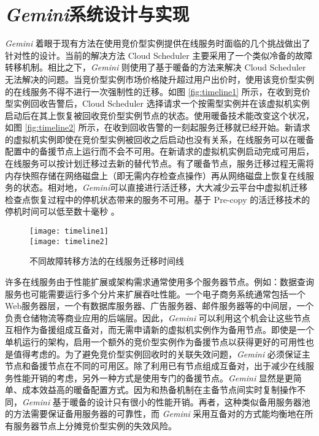 \section{\emph{Gemini}系统设计与实现}
\label{sec-gemini}
\emph{Gemini} 着眼于现有方法在使用竞价型实例提供在线服务时面临的几个挑战做出了针对性的设计。当前的解决方法 Cloud Scheduler \cite{He:2015:CCH:2749246.2749275} 主要采用了一个类似冷备的故障转移机制。相比之下，\emph{Gemini} 则使用了基于暖备的方法来解决 Cloud Scheduler 无法解决的问题。当竞价型实例市场价格陡升超过用户出价时，使用该竞价型实例的在线服务不得不进行一次强制性的迁移。如图 \ref{fig:timeline1} 所示，在收到竞价型实例回收告警后，Cloud Scheduler 选择请求一个按需型实例并在该虚拟机实例启动后在其上恢复被回收竞价型实例节点的状态。使用暖备技术能改变这个状况，如图 \ref{fig:timeline2} 所示，在收到回收告警的一刻起服务迁移就已经开始。新请求的虚拟机实例即使在竞价型实例被回收之后启动也没有关系，在线服务可以在暖备配置中的备援节点上运行而不会不可用。在新请求的虚拟机实例启动完成可用后，在线服务可以按计划迁移过去新的替代节点。有了暖备节点，服务迁移过程无需将内存快照存储在网络磁盘上（即无需内存检查点操作）再从网络磁盘上恢复在线服务的状态。相对地，\emph{Gemini}可以直接进行活迁移，大大减少云平台中虚拟机迁移检查点恢复过程中的停机状态带来的服务不可用。基于 Pre-copy 的活迁移技术的停机时间可以低至数十毫秒 \cite{Clark:2005:LMV:1251203.1251223}。
\begin{figure}
  \centering%
    {\texttt{[image: timeline1]}}%
  \\
  \vspace{5em}%
      {\texttt{[image: timeline2]}}
  \vspace{5em}%
  \caption{不同故障转移方法的在线服务迁移时间线}
  \label{fig:timeline}
\end{figure}

许多在线服务由于性能扩展或架构需求通常使用多个服务器节点。例如：数据查询服务也可能需要运行多个分片来扩展吞吐性能。一个电子商务系统通常包括一个Web服务器层，一个有数据库服务器、广告服务器、邮件服务器等的中间层，一个负责仓储物流等商业应用的后端层。因此，\emph{Gemini} 可以利用这个机会让这些节点互相作为备援组成互备对，而无需申请新的虚拟机实例作为备用节点。即使是一个单机运行的架构，启用一个额外的竞价型实例作为备援节点以获得更好的可用性也是值得考虑的。为了避免竞价型实例回收时的关联失效问题，\emph{Gemini} 必须保证主节点和备援节点在不同的可用区。除了利用已有节点组成互备对，出于减少在线服务性能开销的考虑，另外一种方式是使用专门的备援节点。\emph{Gemini} 显然是更简单、成本效益高的暖备配置方式。因为和热备机制在主备节点间实时复制操作不同，\emph{Gemini} 基于暖备的设计只有很小的性能开销。再者，这种类似备用服务器池的方法需要保证备用服务器的可靠性，而 \emph{Gemini} 采用互备对的方式能均衡地在所有服务器节点上分摊竞价型实例的失效风险。

